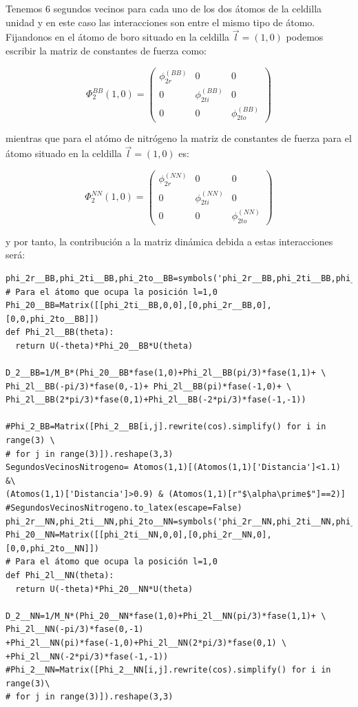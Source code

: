 \documentclass[12pt,a4paper]{article}
\begin{document}
Tenemos \(6\) segundos vecinos para cada uno de los dos átomos de la celdilla unidad y en este caso las interacciones son entre el mismo tipo de átomo. Fijandonos en el átomo de boro situado en la celdilla \(\vec l=(1,0)\) podemos escribir la matriz de constantes de fuerza como:

\begin{equation}
\Phi_{2}^{BB}(1,0)=\begin{pmatrix}
\phi_{2r}^{(BB)} & 0 & 0 \\
0 & \phi_{2ti}^{(BB)} & 0 \\
 0 & 0  & \phi_{2to}^{(BB)}
\end{pmatrix}
\end{equation} 

mientras que para el atómo de nitrógeno la matriz de constantes de fuerza para el átomo situado en la celdilla \(\vec l =(1,0)\) es:

\begin{equation}
\Phi_{2}^{NN}(1,0)=\begin{pmatrix}
\phi_{2r}^{(NN)} & 0 & 0 \\
0 & \phi_{2ti}^{(NN)} & 0 \\
 0 & 0  & \phi_{2to}^{(NN)}
\end{pmatrix}
\end{equation} 

y por tanto, la contribución a la matriz dinámica debida a estas interacciones será:

\begin{verbatim}
phi_2r__BB,phi_2ti__BB,phi_2to__BB=symbols('phi_2r__BB,phi_2ti__BB,phi_2to__BB')
# Para el átomo que ocupa la posición l=1,0
Phi_20__BB=Matrix([[phi_2ti__BB,0,0],[0,phi_2r__BB,0],[0,0,phi_2to__BB]])
def Phi_2l__BB(theta):
  return U(-theta)*Phi_20__BB*U(theta)

D_2__BB=1/M_B*(Phi_20__BB*fase(1,0)+Phi_2l__BB(pi/3)*fase(1,1)+ \
Phi_2l__BB(-pi/3)*fase(0,-1)+ Phi_2l__BB(pi)*fase(-1,0)+ \
Phi_2l__BB(2*pi/3)*fase(0,1)+Phi_2l__BB(-2*pi/3)*fase(-1,-1))

#Phi_2_BB=Matrix([Phi_2__BB[i,j].rewrite(cos).simplify() for i in range(3) \
# for j in range(3)]).reshape(3,3)
SegundosVecinosNitrogeno= Atomos(1,1)[(Atomos(1,1)['Distancia']<1.1) &\
(Atomos(1,1)['Distancia']>0.9) & (Atomos(1,1)[r"$\alpha\prime$"]==2)]
#SegundosVecinosNitrogeno.to_latex(escape=False)
phi_2r__NN,phi_2ti__NN,phi_2to__NN=symbols('phi_2r__NN,phi_2ti__NN,phi_2to__NN')
Phi_20__NN=Matrix([[phi_2ti__NN,0,0],[0,phi_2r__NN,0],[0,0,phi_2to__NN]])
# Para el átomo que ocupa la posición l=1,0
def Phi_2l__NN(theta):
  return U(-theta)*Phi_20__NN*U(theta)

D_2__NN=1/M_N*(Phi_20__NN*fase(1,0)+Phi_2l__NN(pi/3)*fase(1,1)+ \
Phi_2l__NN(-pi/3)*fase(0,-1) +Phi_2l__NN(pi)*fase(-1,0)+Phi_2l__NN(2*pi/3)*fase(0,1) \
+Phi_2l__NN(-2*pi/3)*fase(-1,-1))
#Phi_2__NN=Matrix([Phi_2__NN[i,j].rewrite(cos).simplify() for i in range(3)\
# for j in range(3)]).reshape(3,3)

\end{verbatim}
\end{document}
